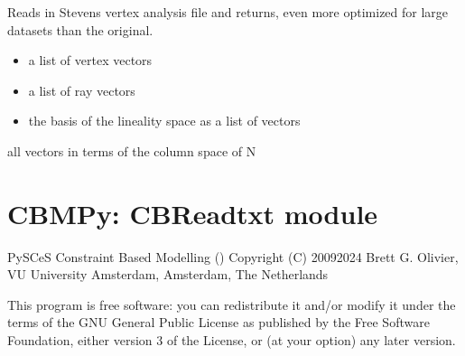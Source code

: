 \documentclass[letterpaper,10pt,english]{sphinxmanual}
\begin{document}

\begin{fulllineitems}
\label{\detokenize{modules_doc:cbmpy.CBRead.readSK_vertexOld}}
\pysigstartsignatures
{}
\pysigstopsignatures
\sphinxAtStartPar
Reads in Stevens vertex analysis file and returns, even more optimized for large datasets than the original.
\begin{itemize}
\item {} 
\sphinxAtStartPar
a list of vertex vectors

\item {} 
\sphinxAtStartPar
a list of ray vectors

\item {} 
\sphinxAtStartPar
the basis of the lineality space as a list of vectors

\end{itemize}

\sphinxAtStartPar
all vectors in terms of the column space of N

\end{fulllineitems}

\label{\detokenize{modules_doc:module-cbmpy.CBReadtxt}}

\section{CBMPy: CBReadtxt module}
\label{\detokenize{modules_doc:cbmpy-cbreadtxt-module}}
\sphinxAtStartPar
PySCeS Constraint Based Modelling ()
Copyright (C) 2009\sphinxhyphen{}2024 Brett G. Olivier, VU University Amsterdam, Amsterdam, The Netherlands

\sphinxAtStartPar
This program is free software: you can redistribute it and/or modify
it under the terms of the GNU General Public License as published by
the Free Software Foundation, either version 3 of the License, or
(at your option) any later version.
\end{document}
